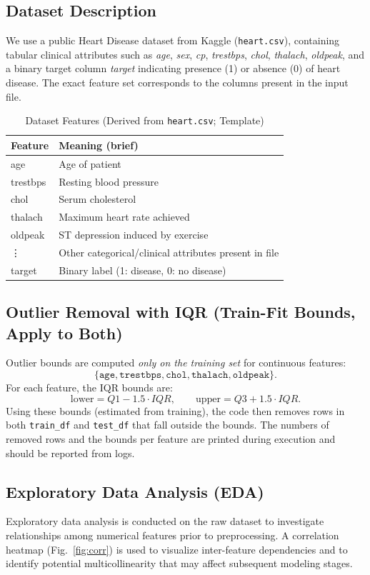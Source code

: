 \documentclass[10pt,conference]{IEEEtran}
\begin{document}
\subsection{Dataset Description}
We use a public Heart Disease dataset from Kaggle (\texttt{heart.csv}), containing tabular clinical attributes such as \textit{age}, \textit{sex}, \textit{cp}, \textit{trestbps}, \textit{chol}, \textit{thalach}, \textit{oldpeak}, and a binary target column \textit{target} indicating presence (1) or absence (0) of heart disease. The exact feature set corresponds to the columns present in the input file.

\begin{table}[t]
\centering
\caption{Dataset Features (Derived from \texttt{heart.csv}; Template)}
\label{tab:dataset_features}
\begin{tabular}{p{3.2cm}p{4.8cm}}
\toprule
Feature & Meaning (brief) \\
\midrule
age & Age of patient \\
trestbps & Resting blood pressure \\
chol & Serum cholesterol \\
thalach & Maximum heart rate achieved \\
oldpeak & ST depression induced by exercise \\
\vdots & Other categorical/clinical attributes present in file \\
target & Binary label (1: disease, 0: no disease) \\
\bottomrule
\end{tabular}
\end{table}


\subsection{Outlier Removal with IQR (Train-Fit Bounds, Apply to Both)}
Outlier bounds are computed \emph{only on the training set} for continuous features:
\[
\{\texttt{age},\texttt{trestbps},\texttt{chol},\texttt{thalach},\texttt{oldpeak}\}.
\]
For each feature, the IQR bounds are:
\[
\text{lower}=Q1-1.5\cdot IQR,\qquad \text{upper}=Q3+1.5\cdot IQR.
\]
Using these bounds (estimated from training), the code then removes rows in both \texttt{train\_df} and \texttt{test\_df} that fall outside the bounds. The numbers of removed rows and the bounds per feature are printed during execution and should be reported from logs.

\subsection{Exploratory Data Analysis (EDA)}
Exploratory data analysis is conducted on the raw dataset to investigate relationships among numerical features prior to preprocessing. A correlation heatmap (Fig.~\ref{fig:corr}) is used to visualize inter-feature dependencies and to identify potential multicollinearity that may affect subsequent modeling stages.
\end{document}
